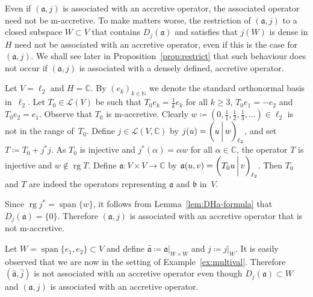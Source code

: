 \documentclass[a4paper,oneside,12pt]{amsart}
\theoremstyle{plain}
\theoremstyle{definition}
\newenvironment{example}
{\pushQED{\qed}

\examplex}
{\popQED\endexamplex}
\let\ge=\geqslant
\begin{document}
Even if $({{\mathfrak{{a}}}},j)$ is associated with an accretive operator, the associated operator need not be {\ensuremath{\text{m}}}-accretive. To make matters worse, 
the restriction of $({{\mathfrak{{a}}}},j)$ to a closed subspace $W\subset V$ that contains $D_j({{\mathfrak{{a}}}})$ and satisfies that $j(W)$ is dense in $H$
need not be associated with an accretive operator, even if this is the case for $({{\mathfrak{{a}}}},j)$.
We shall see later in Proposition~\ref{prop:restrict} that such behaviour does not occur if $({{\mathfrak{{a}}}},j)$ is associated with a densely defined, accretive operator. 
\begin{example}\label{ex:welldef-nonmacc}
Let $V=\ell_2$ and $H={\mathbb{C}}$. By $(e_k)_{k\in{\mathbb{N}}}$ we denote the standard orthonormal basis in~$\ell_2$.
Let $T_0\in{\mathcal{L}}(V)$ be such that $T_0e_k=\tfrac{1}{k}e_k$ for all $k\ge 3$, $T_0e_1=-e_2$ and $T_0e_2=e_1$.
Observe that $T_0$ is {\ensuremath{\text{m}}}-accretive.
Clearly $w\coloneqq(0,\tfrac{1}{1},\tfrac{1}{2},\tfrac{1}{3},\ldots)\in\ell_2$ is not in the range of~$T_0$.
Define $j\in{\mathcal{L}}(V,{\mathbb{C}})$ by $j(u)={{\ifthenelse{\equal{auto}{auto}}{\left({u}\mkern3mu{\biggm|}\mkern3mu {w}\right)}{}
\ifthenelse{\equal{auto}{b}}{\bigl({u}\mkern3mu{\biggm|}\mkern3mu {w}\bigr)}{}
\ifthenelse{\equal{auto}{B}}{\Bigl({u}\mkern3mu{\bigm|}\mkern3mu {w}\Bigr)}{}
}}_{\ell_2}$,
and set $T\coloneqq T_0+j^*j$.
As $T_0$ is injective and $j^*(\alpha)=\alpha w$ for all $\alpha\in{\mathbb{C}}$, the operator $T$ is injective and $w\notin\operatorname{rg} T$.
Define ${{\mathfrak{{a}}}}\colon V\times V\to{\mathbb{C}}$ by ${{\mathfrak{{a}}}}(u,v)={{\ifthenelse{\equal{auto}{auto}}{\left({T_0u}\mkern3mu{\biggm|}\mkern3mu {v}\right)}{}
\ifthenelse{\equal{auto}{b}}{\bigl({T_0u}\mkern3mu{\biggm|}\mkern3mu {v}\bigr)}{}
\ifthenelse{\equal{auto}{B}}{\Bigl({T_0u}\mkern3mu{\bigm|}\mkern3mu {v}\Bigr)}{}
}}_{\ell_2}$.
Then $T_0$ and $T$ are indeed the operators representing ${{\mathfrak{{a}}}}$ and ${{\mathfrak{{b}}}}$ in~$V$.

Since $\operatorname{rg} j^*=\operatorname{span}\{w\}$, it follows from Lemma~\ref{lem:DHa-formula} that $D_j({{\mathfrak{{a}}}})=\{0\}$.
Therefore $({{\mathfrak{{a}}}},j)$ is associated with an accretive operator that is not {\ensuremath{\text{m}}}-accretive.

Let $W=\operatorname{span}\{e_1,e_2\}\subset V$ and define ${{\mathfrak{{\hat{a}}}}}\coloneqq{\ensuremath{{{{\mathfrak{{a}}}}}|_{{W\times W}}}}$ and $\hat{j}\coloneqq{\ensuremath{{j}|_{{W}}}}$.
It is easily observed that we are now in the setting of Example~\ref{ex:multival}.
Therefore $({{\mathfrak{{\hat{a}}}}},\hat{j})$ is not associated with an accretive operator 
even though $D_j({{\mathfrak{{a}}}})\subset W$ and $({{\mathfrak{{a}}}},j)$ is associated with an accretive operator.


\end{example}
\end{document}
